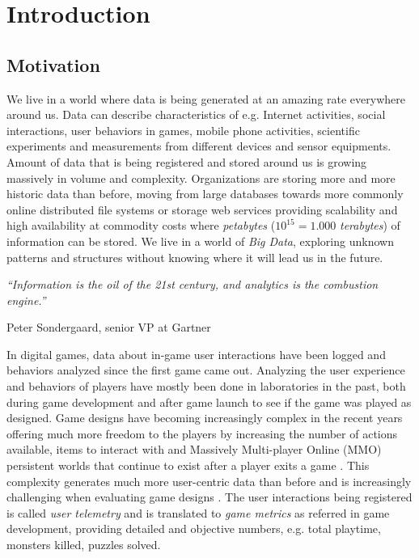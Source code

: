 
\chapter{Introduction} %
\label{Chapter1}

\section{Motivation}
We live in a world where data is being generated at an amazing rate everywhere around us. Data can describe characteristics of e.g. Internet activities, social interactions, user behaviors in games, mobile phone activities, scientific experiments and measurements from different devices and sensor equipments. Amount of data that is being registered and stored around us is growing massively in volume and complexity. Organizations are storing more and more historic data than before, moving from large databases towards more commonly online distributed file systems or storage web services providing scalability and high availability at commodity costs where \textit{petabytes} ($10^{15} = 1.000$ \textit{terabytes}) of information can be stored. We live in a world of \textit{Big Data}, exploring unknown patterns and structures without knowing where it will lead us in the future. 

\null
\textit{``Information is the oil of the 21st century, and analytics is the combustion engine.''}

\begin{flushright}
Peter Sondergaard, senior VP at Gartner
\end{flushright}

In digital games, data about in-game user interactions have been logged and behaviors analyzed since the first game came out. Analyzing the user experience and behaviors of players have mostly been done in laboratories in the past, both during game development and after game launch to see if the game was played as designed. Game designs have becoming increasingly complex in the recent years offering much more freedom to the players by increasing the number of actions available, items to interact with and Massively Multi-player Online (MMO) persistent worlds that continue to exist after a player exits a game \citep{Kim:2008Tracking, Drachen:2011Evaluating}. This complexity generates much more user-centric data than before and is increasingly challenging when evaluating game designs \citep{Pagulayan:2002UserDesign, Seif:2013GameAnalytics}. The user interactions being registered is called \textit{user telemetry} and is translated to \textit{game metrics} as referred in game development, providing detailed and objective numbers, e.g. total playtime, monsters killed, puzzles solved.

